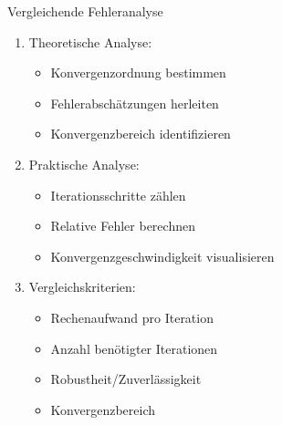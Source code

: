 \begin{KR}{Vergleichende Fehleranalyse}
\begin{enumerate}
    \item Theoretische Analyse:
    \begin{itemize}
        \item Konvergenzordnung bestimmen
        \item Fehlerabschätzungen herleiten
        \item Konvergenzbereich identifizieren
    \end{itemize}
    
    \item Praktische Analyse:
    \begin{itemize}
        \item Iterationsschritte zählen
        \item Relative Fehler berechnen
        \item Konvergenzgeschwindigkeit visualisieren
    \end{itemize}
    
    \item Vergleichskriterien:
    \begin{itemize}
        \item Rechenaufwand pro Iteration
        \item Anzahl benötigter Iterationen
        \item Robustheit/Zuverlässigkeit
        \item Konvergenzbereich
    \end{itemize}
\end{enumerate}
\end{KR}


